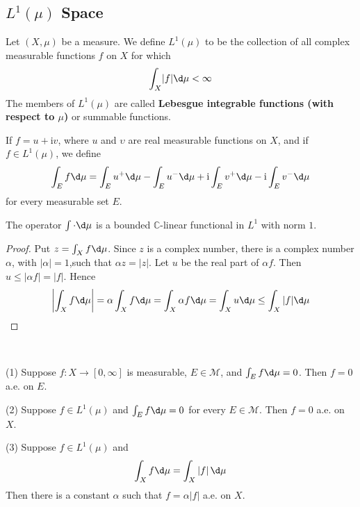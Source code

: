 \documentclass[12pt, a4paper, oneside]{book}
\begin{document}
\subsection{\texorpdfstring{$L^1(\mu)$}{} Space}
\begin{definition}
    Let $\left(X,\mu\right)$ be a measure.
    We define $L^1(\mu)$ to be the collection of all complex measurable functions $f$ on $X$ for which
    $$\int_X\lvert f\rvert\d \mu<\infty$$
    The members of $L^1(\mu)$ are called \textbf{Lebesgue integrable functions (with respect to $\mu$)} or summable functions.

    If $f = u + \mathrm{i} v $, where $u$ and $\upsilon$ are real measurable
    functions on $X$, and if $f\in L^1(\mu)$, we define
    $$\int_Ef \d \mu = \int_E u^+ \d \mu - \int_E u^- \d \mu + \mathrm{i} \int_E v^+ \d \mu - \mathrm{i} \int_Ev^-\d \mu $$for every measurable set $E$.
\end{definition}


\begin{theorem}
    The operator $\int \cdot \d \mu$ is a bounded $\mathbb{C}$-linear functional in $L^1$ with norm $1$.
    \begin{proof}
        Put $z=\int_X f\d \mu$. Since $z$ is a complex number, there is a complex number $\alpha$, with $\left|\alpha\right|=1$,such that $\alpha z=\left|z\right|$.
        Let $u$ be the real part of $\alpha f$. Then $u\leq\left|\alpha f\right|=\left|f\right|$. Hence
        \begin{equation*}
            \left|\int_{X}f\d \mu\right|=\alpha\int_{X}f\d \mu=\int_{X}\alpha f\d \mu=\int_{X}u\d \mu\leq\int_{X}|f|\d \mu
        \end{equation*}
    \end{proof}
\end{theorem}



\begin{theorem}\

    (1) Suppose $f:X\longrightarrow[0,\infty]$ is measurable, $E\in\mathcal{M}$, and $\int_E f \d \mu=0$. Then $f=0$ a.e. on $E$.

    (2) Suppose $f\in L^1(\mu)$ and $\int_E f\d \mu=0$ for every $E\in\mathcal{M}$. Then $f=0$ a.e. on $X$.

    (3) Suppose $f\in L^{1}(\mu)$ and
    $$\int_X f\d \mu=\int_X\left|f\right| \d \mu$$
    Then there is a constant $\alpha$ such that $f = \alpha \left|f\right|$ a.e. on $X$.
\end{theorem}
\end{document}
